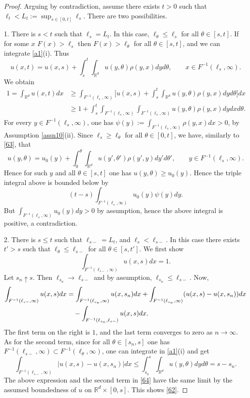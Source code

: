 \documentclass[11pt]{amsart}
\theoremstyle{plain}
\newcommand{\R}{{\mathbb R}}
\newcommand{\iy}{\infty}
\newcommand{\F}{F}
\begin{document}
\begin{proof}
Arguing by contradiction, assume
there exists $t>0$ such that $\ell_t<L_t:=\sup_{s\in[0,t]}\ell_s$.
There are two possibilities.

1. There is $s<t$ such that $\ell_s=L_t$.
In this case, $\ell_\theta\le\ell_s$ for all $\theta\in[s,t]$.
If for some $x$ $\F(x)>\ell_s$ then $\F(x)>\ell_\theta$ for all
$\theta\in[s,t]$, and we can integrate \eqref{a1}(i). Thus
\begin{equation}\label{63}
u(x,t)=u(x,s)+\int_s^t\int_{\R^d}u(y,\theta)\rho(y,x)dyd\theta,
\qquad x\in \F^{-1}(\ell_s,\iy).
\end{equation}
We obtain
\begin{align*}
1=\int_{\R^d} u(x,t)dx&\ge\int_{\F^{-1}(\ell_s,\iy)} \Big[u(x,s)
+\int_s^t\int_{\R^d} u(y,\theta)\rho(y,x)dy d\theta \Big]dx\\
&\ge
1 +\int_s^t\int_{\F^{-1}(\ell_s,\iy)}\int_{\F^{-1}(\ell_s,\iy)} u(y,\theta)\rho(y,x)dy dx d\theta.
\end{align*}
For every $y\in \F^{-1}(\ell_s,\iy)$, one has
$\psi(y):=\int_{\F^{-1}(\ell_s,\iy)}\rho(y,x)dx>0$, by Assumption \ref{assn10}(ii).
Since $\ell_s\ge\ell_\theta$ for all $\theta\in[0,t]$,
we have, similarly to \eqref{63}, that
\[
u(y,\theta)=u_0(y)+\int_0^\theta\int_{\R^d}u(y',\theta')\rho(y',y)dy'd\theta',
\qquad y\in \F^{-1}(\ell_s,\iy).
\]
Hence for such $y$ and all $\theta\in[s,t]$ one has $u(y,\theta)\ge u_0(y)$.
Hence the triple integral above is bounded below by
\[
(t-s)\int_{\F^{-1}(\ell_s,\iy)} u_0(y)\psi(y)dy.
\]
But $\int_{\F^{-1}(\ell_s,\iy)}u_0(y)dy>0$ by assumption, hence
the above integral is positive, a contradiction.

2. There is $s\le t$ such that $\ell_{s-}=L_t$, and $\ell_s<\ell_{s-}$.
In this case there exists $t'>s$ such that $\ell_\theta\le\ell_{s-}$ for all $\theta\in[s,t']$.
We first show
\begin{equation}\label{62}
\int_{\F^{-1}(\ell_{s-},\iy)} u(x,s)dx=1.
\end{equation}
Let $s_n\uparrow s$.
Then $\ell_{s_n}\to\ell_{s-}$ and by assumption,
$\ell_{s_n}\le\ell_{s-}$. Now,
\begin{align}\label{64}
\int_{\F^{-1}(\ell_{s-},\iy)}u(x,s)dx
&=\int_{\F^{-1}(\ell_{s_n},\iy)}u(x,s_n)dx
+\int_{\F^{-1}(\ell_{s_n},\iy)}(u(x,s)-u(x,s_n))dx
\\
&\quad-\int_{\F^{-1}(\ell_{s_n},\ell_{s-})} u(x,s)dx.
\notag
\end{align}
The first term on the right is $1$, and the last term converges to zero
as $n\to\iy$. As for the second term,
since for all $\theta\in[s_n,s]$ one has
$\F^{-1}(\ell_{s-},\iy)\subset \F^{-1}(\ell_{\theta},\iy)$,
one can integrate in \eqref{a1}(i) and get
\[
\int_{\F^{-1}(\ell_{s-},\iy)}|u(x,s)-u(x,s_n)|dx
\le\int_{s_n}^s\int_{\R^d}u(y,\theta)dyd\theta=s-s_n.
\]
The above expression and the second term in \eqref{64}
have the same limit by the assumed boundedness of $u$
on $\R^d\times[0,s]$. This shows \eqref{62}.


\end{proof}
\end{document}
